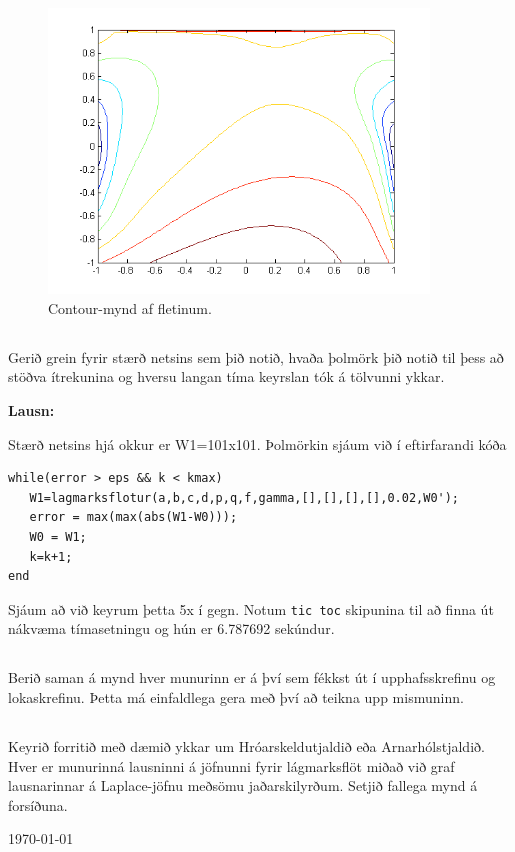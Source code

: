 \documentclass[11pt,a4paper,titlepage]{article}
\begin{document}
    \begin{figure}[h!]
        \centering
        \includegraphics[width=0.9\textwidth]{lagmarksflotur_contour.png}
        \caption{Contour-mynd af fletinum.}
        \label{fig:awesome_image13}
    \end{figure}
\newpage

\subsection{}
Gerið grein fyrir stærð netsins sem þið notið, hvaða þolmörk þið notið til þess að stöðva ítrekunina og hversu langan tíma keyrslan tók á tölvunni ykkar.

 \par
 \textbf{Lausn:}\par
Stærð netsins hjá okkur er W1=101x101.  Þolmörkin sjáum við í eftirfarandi kóða
\begin{verbatim}
while(error > eps && k < kmax)
   W1=lagmarksflotur(a,b,c,d,p,q,f,gamma,[],[],[],[],0.02,W0');
   error = max(max(abs(W1-W0)));
   W0 = W1;
   k=k+1;
end
\end{verbatim} 
Sjáum að við keyrum þetta 5x í gegn. Notum \verb|tic toc| skipunina til að finna út nákvæma tímasetningu og hún er 6.787692 sekúndur.

\subsection{}
Berið saman á mynd hver munurinn er á því sem fékkst út í upphafsskrefinu og lokaskrefinu. Þetta má einfaldlega gera með því að teikna upp mismuninn.

\subsection{}
Keyrið forritið með dæmið ykkar um Hróarskeldutjaldið eða Arnarhólstjaldið. Hver er munurinná lausninni á jöfnunni fyrir lágmarksflöt miðað við graf lausnarinnar á Laplace-jöfnu meðsömu jaðarskilyrðum. Setjið fallega mynd á forsíðuna.
 
 
\newpage
\begin{flushright}
 \today
\end{flushright}
\end{document}
